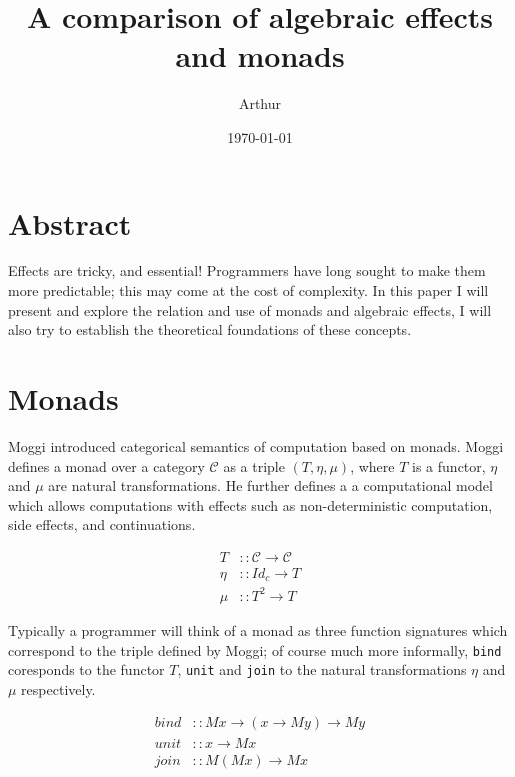 \documentclass[a4paper,10pt]{article}
\title{A comparison of algebraic effects and monads}
\author{Arthur}
\date{\today}
\theoremstyle{definition}
\begin{document}
\maketitle
\section{Abstract}

Effects are tricky, and essential!
Programmers have long sought to make them more predictable;
this may come at the cost of complexity.
In this paper I will present and explore
the relation and use of monads and algebraic effects,
I will also try to establish the theoretical foundations of these concepts.

\section{Monads}

Moggi \cite{moggi1989computational} introduced categorical semantics of computation
based on monads. Moggi defines a monad over a category $\mathcal{C}$ as a triple $(T,\eta,\mu)$,
where $T$ is a functor, $\eta$ and $\mu$ are natural transformations. He further defines a
a computational model which allows computations with effects such as non-deterministic 
computation, side effects, and continuations.

\begin{equation}
  \begin{split}
    T    &:: \mathcal{C} \rightarrow \mathcal{C} \\
    \eta &:: Id_c \rightarrow T                  \\
    \mu  &:: T^2 \rightarrow T
  \end{split}
\end{equation}

Typically a programmer will think of a monad as three function signatures
which correspond to the triple defined by Moggi; of course much more
informally, \texttt{bind} coresponds to the functor $T$, \texttt{unit} and \texttt{join} to the
natural transformations $\eta$ and $\mu$ respectively.

\begin{equation}
  \begin{split}
    bind &:: M x \rightarrow (x \rightarrow M y) \rightarrow M y \\
    unit &:: x \rightarrow M x                                   \\
    join &:: M (M x) \rightarrow M x
  \end{split}
\end{equation}
\end{document}

